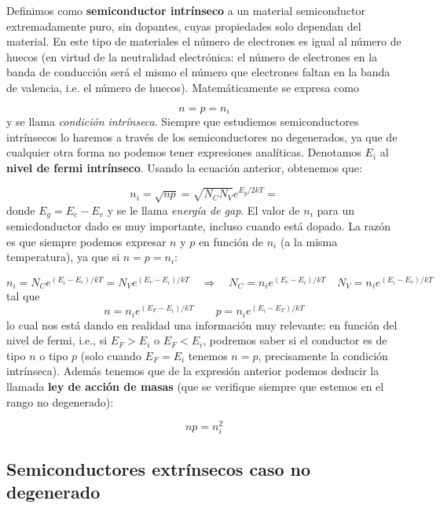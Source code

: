 Definimos como \textbf{semiconductor intrínseco} a un material semiconductor extremadamente puro, sin dopantes, cuyas propiedades solo dependan del material. En este tipo de materiales el número de electrones es igual al número de huecos (en virtud de la neutralidad electrónica: el número de electrones en la banda de conducción será el mismo el número que electrones faltan en la banda de valencia, i.e. el número de huecos). Matemáticamente se expresa como 

\begin{equation}
	n = p = n_i
\end{equation}
y se llama \textit{condición intrínseca}. Siempre que estudiemos semiconductores intrínsecos lo haremos a través de los semiconductores no degenerados, ya que de cualquier otra forma no podemos tener expresiones analíticas. Denotamos $E_i$ al \textbf{nivel de fermi intrínseco}. Usando la ecuación anterior, obtenemos que:

\begin{equation}
	n_i = \sqrt{np} = \sqrt{N_CN_V} e^{E_g/2kT} = 
\end{equation}
donde $E_g=E_c-E_v$ y se le llama \textit{energía de gap}. El valor de $n_i$ para un semicdonductor dado es muy importante, incluso cuando está dopado. La razón es que siempre podemos expresar $n$ y $p$  en función de $n_i$ (a la misma temperatura), ya que si $n=p=n_i$:

\begin{equation}
	n_i = N_C e^{(E_i-E_c)/kT} = N_V e^{(E_v-E_i)/kT} \quad \Rightarrow \quad N_C=n_i e^{(E_c-E_i)/kT} \quad N_V = n_i e^{(E_i-E_v)/kT}
 \end{equation}
tal que
\begin{equation}
	n=n_i e^{(E_F-E_i)/kT} \qquad p = n_i e^{(E_i-E_F)/kT}
\end{equation}
lo cual nos está dando en realidad una información muy relevante: en función del nivel de fermi, i.e., si $E_F>E_i$ o $E_F<E_i$, podremos saber si el conductor es de tipo $n$ o tipo $p$ (solo cuando $E_F=E_i$ tenemos $n=p$, precisamente la condición intrínseca). Además tenemos que de la expresión anterior podemos deducir la llamada \textbf{ley de acción de masas} (que se verifique siempre que estemos en el rango no degenerado):

\begin{equation}
	np=n_i^2
\end{equation}

\subsection{Semiconductores extrínsecos caso no degenerado}

